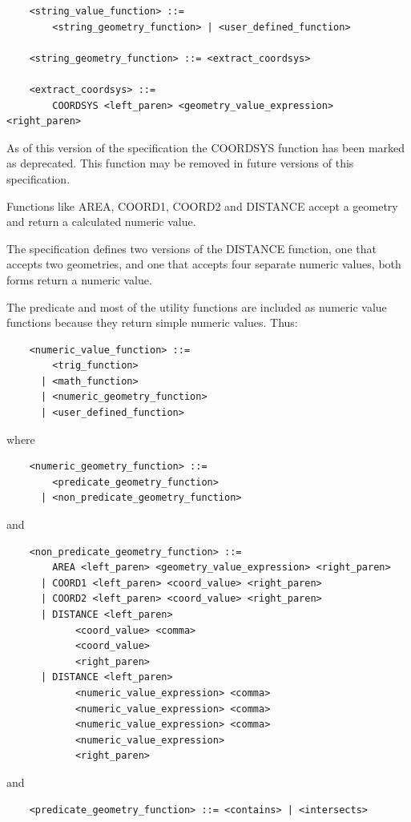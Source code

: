 \documentclass[11pt,a4paper]{ivoa}
\begin{document}
\begin{verbatim}
    <string_value_function> ::=
        <string_geometry_function> | <user_defined_function>

    <string_geometry_function> ::= <extract_coordsys>

    <extract_coordsys> ::=
        COORDSYS <left_paren> <geometry_value_expression> <right_paren>
\end{verbatim}

As of this version of the specification the COORDSYS function has
been marked as deprecated. This function may be removed in future versions
of this specification.

Functions like AREA, COORD1, COORD2 and DISTANCE accept a geometry and
return a calculated numeric value.

The specification defines two versions of the DISTANCE function,
one that accepts two geometries, and one that accepts four
separate numeric values, both forms return a numeric value.

The predicate and most of the utility functions are included as numeric
value functions because they return simple numeric values.
Thus:
\begin{verbatim}
    <numeric_value_function> ::=
        <trig_function>
      | <math_function>
      | <numeric_geometry_function>
      | <user_defined_function>
\end{verbatim}
\noindent
where
\begin{verbatim}
    <numeric_geometry_function> ::=
        <predicate_geometry_function>
      | <non_predicate_geometry_function>
\end{verbatim}
\noindent
and
\begin{verbatim}
    <non_predicate_geometry_function> ::=
        AREA <left_paren> <geometry_value_expression> <right_paren>
      | COORD1 <left_paren> <coord_value> <right_paren>
      | COORD2 <left_paren> <coord_value> <right_paren>
      | DISTANCE <left_paren>
            <coord_value> <comma>
            <coord_value>
            <right_paren>
      | DISTANCE <left_paren>
            <numeric_value_expression> <comma>
            <numeric_value_expression> <comma>
            <numeric_value_expression> <comma>
            <numeric_value_expression>
            <right_paren>
\end{verbatim}
\noindent
and
\begin{verbatim}
    <predicate_geometry_function> ::= <contains> | <intersects>
\end{verbatim}
\end{document}

